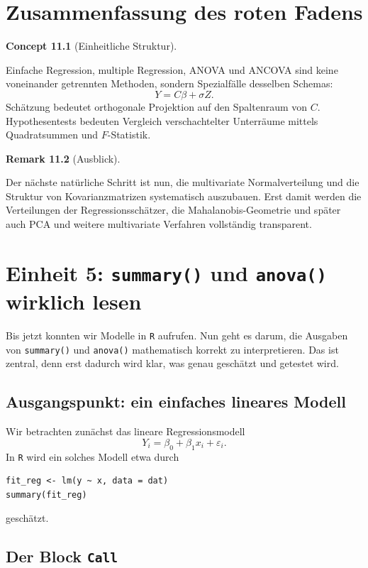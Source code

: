 \documentclass[10pt, letterpaper]{article}
\newcommand{\CustomHeading}[3]{%
  \par\medskip\noindent%
  \textbf{#1 #2} \textnormal{(#3)}.\enskip%
}
\newenvironment{REM}[2]{\CustomHeading{Remark}{#1}{#2}}{}
\newenvironment{CONC}[2]{\CustomHeading{Concept}{#1}{#2}}{}
\begin{document}
\section{Zusammenfassung des roten Fadens}

\begin{CONC}{11.1}{Einheitliche Struktur}
Einfache Regression, multiple Regression, ANOVA und ANCOVA sind keine voneinander getrennten Methoden, sondern Spezialfälle desselben Schemas:
\[
Y=C\beta+\sigma Z.
\]
Schätzung bedeutet orthogonale Projektion auf den Spaltenraum von \(C\). Hypothesentests bedeuten Vergleich verschachtelter Unterräume mittels Quadratsummen und \(F\)-Statistik.
\end{CONC}

\begin{REM}{11.2}{Ausblick}
Der nächste natürliche Schritt ist nun, die multivariate Normalverteilung und die Struktur von Kovarianzmatrizen systematisch auszubauen. Erst damit werden die Verteilungen der Regressionsschätzer, die Mahalanobis-Geometrie und später auch PCA und weitere multivariate Verfahren vollständig transparent.
\end{REM}


\pagebreak

\section{Einheit 5: \texttt{summary()} und \texttt{anova()} wirklich lesen}

Bis jetzt konnten wir Modelle in \texttt{R} aufrufen. Nun geht es darum, die Ausgaben von \texttt{summary()} und \texttt{anova()} mathematisch korrekt zu interpretieren. Das ist zentral, denn erst dadurch wird klar, was genau geschätzt und getestet wird.

\subsection{Ausgangspunkt: ein einfaches lineares Modell}

Wir betrachten zunächst das lineare Regressionsmodell
\[
Y_i=\beta_0+\beta_1 x_i+\varepsilon_i.
\]
In \texttt{R} wird ein solches Modell etwa durch
\begin{verbatim}
fit_reg <- lm(y ~ x, data = dat)
summary(fit_reg)
\end{verbatim}
geschätzt.

\subsection{Der Block \texttt{Call}}
\end{document}
